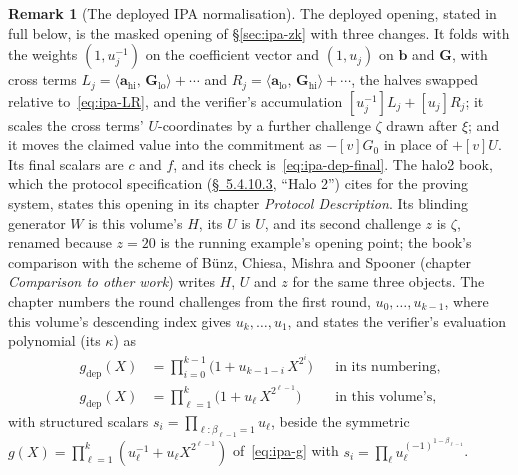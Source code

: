 \documentclass[11pt,a4paper]{article}
\theoremstyle{definition}
\newtheorem{remark}[theorem]{Remark}
\newcommand{\ip}[2]{\langle #1,\, #2 \rangle}
\begin{document}
\begin{remark}[The deployed IPA normalisation]\label{rem:ipa-deployed-norm}
The deployed opening, stated in full below, is the masked opening of
\S\ref{sec:ipa-zk} with three changes. It folds with the weights
$(1, u_j^{-1})$ on the coefficient vector and $(1, u_j)$ on $\mathbf b$
and $\mathbf G$, with cross terms $L_j = \ip{\mathbf a_{\mathrm{hi}}}
{\mathbf G_{\mathrm{lo}}} + \cdots$ and $R_j = \ip{\mathbf a_{\mathrm{lo}}}
{\mathbf G_{\mathrm{hi}}} + \cdots$, the halves swapped relative
to~\eqref{eq:ipa-LR}, and the verifier's accumulation
$[u_j^{-1}]L_j + [u_j]R_j$; it scales the cross terms' $U$-coordinates
by a further challenge $\zeta$ drawn after $\xi$; and it moves the
claimed value into the commitment as $-[v]G_0$ in place of $+[v]U$. Its
final scalars are $c$ and $f$, and its check
is~\eqref{eq:ipa-dep-final}. The halo2
book, which the protocol specification
(\href{https://zips.z.cash/protocol/protocol.pdf\#halo2}{\S~5.4.10.3},
``Halo 2'') cites for the proving system, states this opening in its chapter
\emph{Protocol Description}. Its blinding generator $W$ is this volume's
$H$, its $U$ is $U$, and its second challenge $z$ is $\zeta$, renamed
because $z = 20$ is the running example's opening point; the book's
comparison with the scheme of B\"unz, Chiesa, Mishra and Spooner
(chapter \emph{Comparison to other work}) writes $H$, $U$ and $z$ for
the same three objects. The chapter numbers the round challenges from
the first round, $u_0, \dots, u_{k-1}$, where this volume's descending
index gives $u_k, \dots, u_1$, and states the verifier's evaluation
polynomial (its $\kappa$) as
\begin{equation}\label{eq:ipa-g-dep}
\begin{aligned}
g_{\mathrm{dep}}(X)
 &= \prod_{i=0}^{k-1}\bigl(1 + u_{k-1-i}\,X^{2^{i}}\bigr)
 &&\text{in its numbering,} \\
g_{\mathrm{dep}}(X)
 &= \prod_{\ell=1}^{k}\bigl(1 + u_\ell\,X^{2^{\ell-1}}\bigr)
 &&\text{in this volume's,}
\end{aligned}
\end{equation}
with structured scalars $s_i = \prod_{\ell : \beta_{\ell-1} = 1} u_\ell$,
beside the symmetric $g(X) = \prod_{\ell=1}^{k}(u_\ell^{-1} + u_\ell
X^{2^{\ell-1}})$ of~\eqref{eq:ipa-g} with
$s_i = \prod_\ell u_\ell^{(-1)^{1 - \beta_{\ell-1}}}$.


\end{remark}
\end{document}
